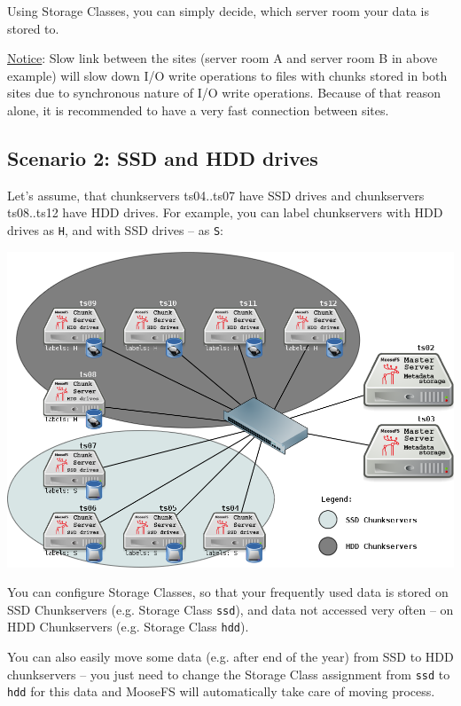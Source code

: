 \documentclass[a4paper,11pt,english]{report}
\def\code#1{\texttt{#1}}
\begin{document}
			Using Storage Classes, you can simply decide, which server room your data is stored to.
	
			\underline{Notice}: Slow link between the sites (server room A and server room B in above example) will slow down I/O write operations to files with chunks stored in both sites due to synchronous nature of I/O write operations. Because of that reason alone, it is recommended to have a very fast connection between sites.
			
			\pagebreak			
			
			\subsection{Scenario 2: SSD and HDD drives}
	
			Let's assume, that chunkservers ts04..ts07 have SSD drives and chunkservers ts08..ts12 have HDD drives. For example, you can label chunkservers with HDD drives as \code{H}, and with SSD drives -- as \code{S}:
			
			
			\bigskip
			\includegraphics[scale=0.5]{images/diagram_ssd_hdd_v2.png}
			
			\bigskip
			You can configure Storage Classes, so that your frequently used data is stored on SSD Chunkservers (e.g. Storage Class \code{ssd}), and data not accessed very often  -- on HDD Chunkservers (e.g. Storage Class \code{hdd}).
			
			You can also easily move some data (e.g. after end of the year) from SSD to HDD chunkservers -- you just need to change the Storage Class assignment from \code{ssd} to \code{hdd} for this data and MooseFS will automatically take care of moving process.
			
\end{document}
